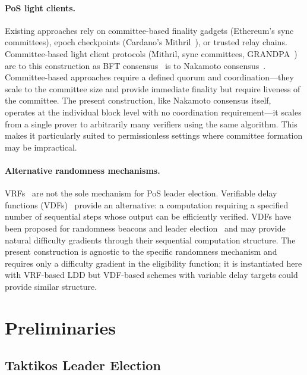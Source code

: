 \documentclass[11pt]{article}
\begin{document}
\paragraph{PoS light clients.} Existing approaches rely on committee-based finality gadgets (Ethereum's sync committees), epoch checkpoints (Cardano's Mithril~\cite{mithril}), or trusted relay chains. Committee-based light client protocols (Mithril, sync committees, GRANDPA~\cite{grandpa}) are to this construction as BFT consensus~\cite{tendermint} is to Nakamoto consensus~\cite{nakamoto}. Committee-based approaches require a defined quorum and coordination---they scale to the committee size and provide immediate finality but require liveness of the committee. The present construction, like Nakamoto consensus itself, operates at the individual block level with no coordination requirement---it scales from a single prover to arbitrarily many verifiers using the same algorithm. This makes it particularly suited to permissionless settings where committee formation may be impractical.

\paragraph{Alternative randomness mechanisms.} VRFs~\cite{vrf} are not the sole mechanism for PoS leader election. Verifiable delay functions (VDFs)~\cite{vdf} provide an alternative: a computation requiring a specified number of sequential steps whose output can be efficiently verified. VDFs have been proposed for randomness beacons and leader election~\cite{vdfconsensus} and may provide natural difficulty gradients through their sequential computation structure. The present construction is agnostic to the specific randomness mechanism and requires only a difficulty gradient in the eligibility function; it is instantiated here with VRF-based LDD but VDF-based schemes with variable delay targets could provide similar structure.

\section{Preliminaries}

\subsection{Taktikos Leader Election}
\end{document}
